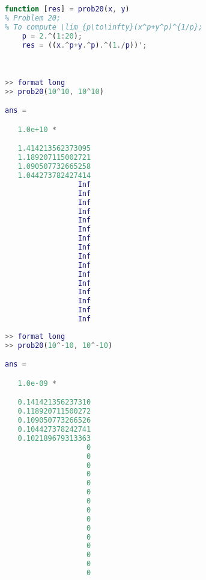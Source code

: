 \begin{lstlisting}[language = MATLAB]
function [res] = prob20(x, y)
% Problem 20;
% To compute \lim_{p\to\infty}(x^p+y^p)^{1/p};
    p = 2.^(1:20);
    res = ((x.^p+y.^p).^(1./p))';
\end{lstlisting}
\\
\begin{minipage}{0.5\textwidth}
\begin{lstlisting}[language = MATLAB]
>> format long
>> prob20(10^10, 10^10)

ans =

   1.0e+10 *

   1.414213562373095
   1.189207115002721
   1.090507732665258
   1.044273782427414
                 Inf
                 Inf
                 Inf
                 Inf
                 Inf
                 Inf
                 Inf
                 Inf
                 Inf
                 Inf
                 Inf
                 Inf
                 Inf
                 Inf
                 Inf
                 Inf
\end{lstlisting}
\end{minipage}
\hspace{10pt}
\begin{minipage}{0.5\textwidth}
\begin{lstlisting}[language = MATLAB]
>> format long
>> prob20(10^-10, 10^-10)

ans =

   1.0e-09 *

   0.141421356237310
   0.118920711500272
   0.109050773266526
   0.104427378242741
   0.102189679313363
                   0
                   0
                   0
                   0
                   0
                   0
                   0
                   0
                   0
                   0
                   0
                   0
                   0
                   0
                   0
\end{lstlisting}
\end{minipage}


